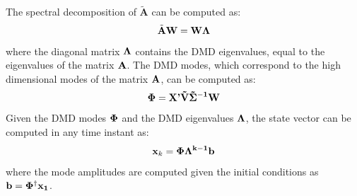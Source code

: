 \documentclass[]{article}
\begin{document}
The spectral decomposition of $\tilde{\textbf{A}}$ can be computed as:
\begin{equation}\label{specdec}
    \tilde{\textbf{A}} \textbf{W} = \textbf{W} \bf{\Lambda} 
\end{equation}
where the diagonal matrix $\bf{\Lambda}$ contains the DMD eigenvalues, equal to the eigenvalues of the matrix $\textbf A$. The DMD modes, which correspond to the high dimensional modes of the matrix $\textbf A$, can be computed as:
\begin{equation}\label{specdec}
    \bf{\Phi} = \textbf{X'} \tilde{\textbf{V}} \tilde{\bf{\Sigma}}^{-1} \textbf{W}
\end{equation}
Given the DMD modes $\bf{\Phi}$ and the DMD eigenvalues $\bf{\Lambda}$, the state vector can be computed in any time instant as:
\begin{equation}
    \textbf{x}_k = \bf{\Phi}\bf{\Lambda}^{k-1} \textbf{b} 
\end{equation}
where the mode amplitudes are computed given the initial conditions as $\textbf{b} = \bf{\Phi}^\dagger\textbf{x}_1$. 
\end{document}
